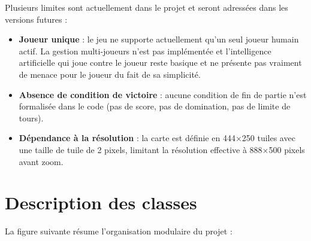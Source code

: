 \documentclass[12pt, a4paper]{article}
\begin{document}
Plusieurs limites sont actuellement dans le projet et seront adressées dans les versions futures :
\begin{itemize}
    \item \textbf{Joueur unique} : le jeu ne supporte actuellement qu'un seul joueur humain
    actif. La gestion multi-joueurs n'est pas implémentée et l'intelligence artificielle qui joue contre le joueur reste basique et ne présente pas vraiment de menace pour le joueur du fait de sa simplicité.

    \item \textbf{Absence de condition de victoire} : aucune condition de fin de partie n'est
    formalisée dans le code (pas de score, pas de domination, pas de limite de tours).

    \item \textbf{Dépendance à la résolution} : la carte est définie en 444$\times$250 tuiles
    avec une taille de tuile de 2 pixels, limitant la résolution effective à 888$\times$500
    pixels avant zoom.
\end{itemize}

\newpage

\section{Description des classes}


La figure suivante résume l'organisation modulaire du projet :
\end{document}
